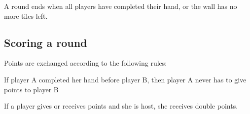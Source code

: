 \documentclass{article}
\begin{document}
A round ends when all players have completed their hand, or the wall has no more tiles left.

\subsection{Scoring a round}
Points are exchanged according to the following rules:
\begin{itemize*}
    \item If player A completed her hand before player B, then player A never has to give points to player B
    \item If a player gives or receives points and she is host, she receives double points.
\end{itemize*}
\end{document}
